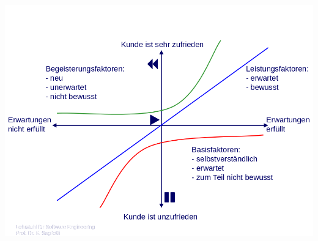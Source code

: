 \includegraphics[scale=0.5]{./inc/Anforderungsspezifikation/ZufriedenheitUndErwartung.png}

























